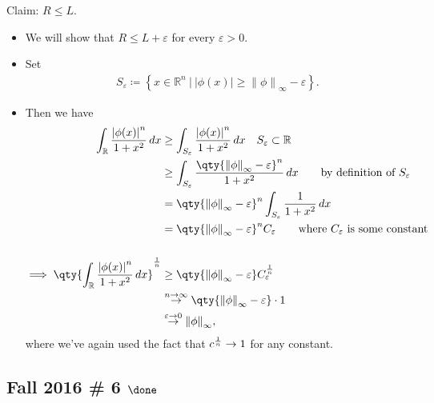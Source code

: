\begin{solution}
Claim: \(R\leq L\).

\begin{itemize}
\tightlist
\item
  We will show that \(R\leq L + \varepsilon\) for every
  \(\varepsilon>0\).
\item
  Set
  \begin{align*}  
  S_\varepsilon\coloneqq\left\{{x\in {\mathbb{R}}^n{~\mathrel{\Big|}~}{\left\lvert {\phi(x)} \right\rvert} \geq {\left\lVert {\phi} \right\rVert}_\infty - \varepsilon}\right\}
  .\end{align*}
\item
  Then we have
  \begin{align*}  
  \int_{\mathbb{R}}{{\left\lvert {\phi(x)} \right\rvert}^n \over 1 +x^2}\,dx
  &\geq \int_{S_\varepsilon} {{\left\lvert {\phi(x)} \right\rvert}^n \over 1 +x^2}\,dx \quad S_\varepsilon\subset {\mathbb{R}}\\
  &\geq \int_{S_\varepsilon} { \qty{{\left\lVert {\phi} \right\rVert}_\infty - \varepsilon}^n \over 1 +x^2}\,dx  \qquad\text{by definition of }S_\varepsilon\\
  &= \qty{{\left\lVert {\phi} \right\rVert}_\infty - \varepsilon}^n \int_{S_\varepsilon} { 1 \over 1 +x^2}\,dx \\
  &= \qty{{\left\lVert {\phi} \right\rVert}_\infty - \varepsilon}^n C_\varepsilon\qquad\text{where $C_\varepsilon$ is some constant} \\ \\
  \implies 
  \qty{ \int_{\mathbb{R}}{{\left\lvert {\phi(x)} \right\rvert}^n \over 1 +x^2}\,dx }^{1\over n} 
  &\geq \qty{{\left\lVert {\phi} \right\rVert}_\infty - \varepsilon} C_\varepsilon^{1 \over n} \\
  &\overset{n\to\infty}\to
  \qty{{\left\lVert {\phi} \right\rVert}_\infty - \varepsilon} \cdot 1 \\
  &\overset{\varepsilon\to 0}\to {\left\lVert {\phi} \right\rVert}_\infty
  ,\end{align*}
  where we've again used the fact that \(c^{1\over n} \to 1\) for any
  constant.
\end{itemize}

\end{solution}

\hypertarget{fall-2016-6-done}{%
\subsection{\texorpdfstring{Fall 2016 \# 6
\(\done\)}{Fall 2016 \# 6 \textbackslash done}}\label{fall-2016-6-done}}

